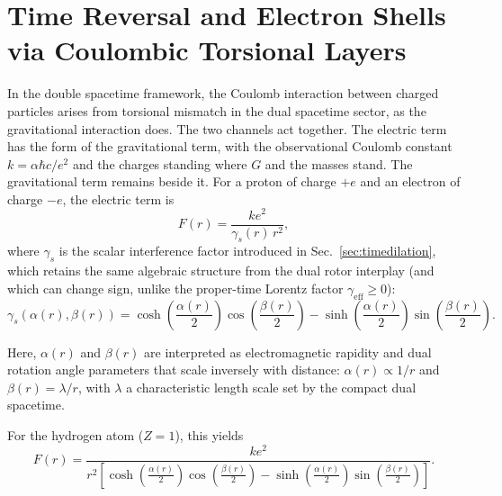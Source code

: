\documentclass[a4paper]{article}
\begin{document}
\section{Time Reversal and Electron Shells via Coulombic Torsional Layers}
\label{sec:electronshells}

In the double spacetime framework, the Coulomb interaction between charged particles arises from torsional mismatch in the dual spacetime sector, as the gravitational interaction does. The two channels act together. The electric term has the form of the gravitational term, with the observational Coulomb constant \(k=\alpha\hbar c/e^{2}\) and the charges standing where \(G\) and the masses stand. The gravitational term remains beside it. For a proton of charge \(+e\) and an electron of charge \(-e\), the electric term is
\[
F(r) = \frac{k e^2}{\gamma_s(r)\, r^2},
\]
where \(\gamma_s\) is the scalar interference factor introduced in Sec.~\ref{sec:timedilation}, which retains the same algebraic structure from the dual rotor interplay (and which can change sign, unlike the proper-time Lorentz factor \(\gamma_\text{eff} \geq 0\)):
\[
\gamma_s(\alpha(r),\beta(r)) = \cosh\!\left(\frac{\alpha(r)}{2}\right) \cos\!\left(\frac{\beta(r)}{2}\right) - \sinh\!\left(\frac{\alpha(r)}{2}\right) \sin\!\left(\frac{\beta(r)}{2}\right).
\]

Here, \(\alpha(r)\) and \(\beta(r)\) are interpreted as electromagnetic rapidity and dual rotation angle parameters that scale inversely with distance: \(\alpha(r) \propto 1/r\) and \(\beta(r) = \lambda / r\), with \(\lambda\) a characteristic length scale set by the compact dual spacetime.

For the hydrogen atom (\(Z=1\)), this yields
\[
F(r) = \frac{k e^2}{r^2 \left[ \cosh\!\left(\frac{\alpha(r)}{2}\right) \cos\!\left(\frac{\beta(r)}{2}\right) - \sinh\!\left(\frac{\alpha(r)}{2}\right) \sin\!\left(\frac{\beta(r)}{2}\right) \right]}.
\]
\end{document}
